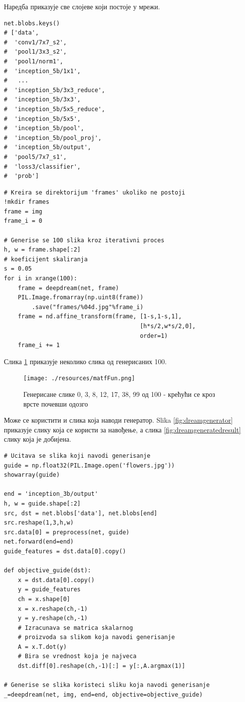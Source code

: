 \documentclass[a4paper]{article}
\begin{document}
Наредба приказује све слојеве који постоје у мрежи.

\begin{verbatim}
net.blobs.keys()
# ['data',
#  'conv1/7x7_s2',
#  'pool1/3x3_s2',
#  'pool1/norm1',
#  'inception_5b/1x1',
#   ...
#  'inception_5b/3x3_reduce',
#  'inception_5b/3x3',
#  'inception_5b/5x5_reduce',
#  'inception_5b/5x5',
#  'inception_5b/pool',
#  'inception_5b/pool_proj',
#  'inception_5b/output',
#  'pool5/7x7_s1',
#  'loss3/classifier',
#  'prob']
\end{verbatim}

\begin{verbatim}
# Kreira se direktorijum 'frames' ukoliko ne postoji
!mkdir frames
frame = img
frame_i = 0

# Generise se 100 slika kroz iterativni proces
h, w = frame.shape[:2]
# koeficijent skaliranja
s = 0.05
for i in xrange(100):
    frame = deepdream(net, frame)
    PIL.Image.fromarray(np.uint8(frame))
        .save("frames/%04d.jpg"%frame_i)
    frame = nd.affine_transform(frame, [1-s,1-s,1],
                                       [h*s/2,w*s/2,0],
                                       order=1)
    frame_i += 1
\end{verbatim}

Слика \ref{fig:matffun} приказује неколико слика од генерисаних 100.

\begin{figure}[h!]
\begin{center}
    \texttt{[image: ./resources/matfFun.png]}
\end{center}
\caption{Генерисане слике 0, 3, 8, 12, 17, 38, 99 од 100 - крећући се кроз врсте почевши одозго}
\label{fig:matffun}
\end{figure}

Може се користити и слика која наводи генератор. Slika \ref{fig:dreamgenerator} приказује
слику која се користи за навођење, а слика \ref{fig:dreamgeneratedresult} слику која је
добијена.

\begin{verbatim}
# Ucitava se slika koji navodi generisanje
guide = np.float32(PIL.Image.open('flowers.jpg'))
showarray(guide)

end = 'inception_3b/output'
h, w = guide.shape[:2]
src, dst = net.blobs['data'], net.blobs[end]
src.reshape(1,3,h,w)
src.data[0] = preprocess(net, guide)
net.forward(end=end)
guide_features = dst.data[0].copy()

def objective_guide(dst):
    x = dst.data[0].copy()
    y = guide_features
    ch = x.shape[0]
    x = x.reshape(ch,-1)
    y = y.reshape(ch,-1)
    # Izracunava se matrica skalarnog 
    # proizvoda sa slikom koja navodi generisanje
    A = x.T.dot(y)
    # Bira se vrednost koja je najveca
    dst.diff[0].reshape(ch,-1)[:] = y[:,A.argmax(1)]

# Generise se slika koristeci sliku koja navodi generisanje
_=deepdream(net, img, end=end, objective=objective_guide)
\end{verbatim}
\end{document}
